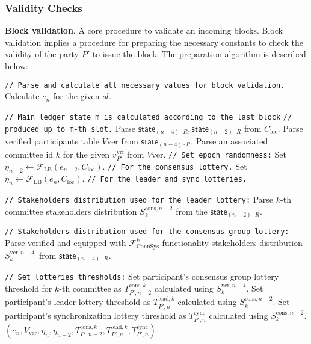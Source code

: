 \subsubsection{Validity Checks}
\textbf{Block validation}.
A core procedure to validate an incoming blocks.
Block validation implies a procedure for preparing the necessary constants to check the validity of the party $P'$ to issue the block.
The preparation algorithm is described below:
\begin{algo}
    \caption{$\textsf{PrepareForBlockValidation}(sl, R, v_{P'}^{\text{vrf}}, C_{\text{loc}})$}
    \begin{algorithmic}[1]
        \noindent
        \lstinline|// Parse and calculate all necessary values for block validation.|
        \State Calculate $e_n$ for the given $sl$.

        \noindent
        \lstinline|// Main ledger state_m is calculated according to the last block|
        \noindent
        \lstinline|// produced up to m-th slot.|
        \State Parse $\textsf{state}_{(n - 4)\cdot R},
        \textsf{state}_{(n - 2)\cdot R}$ from $C_{\text{loc}}$.
        \State Parse verified participants table $V{\text{ver}}$ from $\textsf{state}_{(n - 4)\cdot R}$.
        \State Parse an associated committee id $k$ for the given $v_{P'}^{\text{vrf}}$ from $V{\text{ver}}$.
        \noindent
        \lstinline|// Set epoch randomness:|
        \State Set ${\eta_{n-2} \leftarrow \mathcal{F}_{\text{LB}}(e_{n-2}, C_{\text{loc}})}$. \lstinline|// For the consensus lottery.|
        \State Set ${\eta_{n} \leftarrow \mathcal{F}_{\text{LB}}(e_{n}, C_{\text{loc}})}$. \lstinline|// For the leader and sync lotteries.|

        \noindent
        \lstinline|// Stakeholders distribution used for the leader lottery:|
        \State Parse $k$-th committee stakeholders distribution $S_k^{\text{cons}, n - 2}$ from the $\textsf{state}_{(n - 2)\cdot R}$.

        \noindent
        \lstinline|// Stakeholders distribution used for the consensus group lottery:|
        \State Parse verified and equipped with $\mathcal{F}^k_{\text{ConnSys}}$ functionality stakeholders distribution $S_k^{\text{ver}, {n - 4}}$\
        from $\textsf{state}_{(n - 4)\cdot R}$.

        \noindent
        \lstinline|// Set lotteries thresholds:|
        \State Set participant's consensus group lottery threshold for $k$-th committee as $T_{P', n-2}^{\text{cons}, k}$ calculated using $S_k^{\text{ver}, {n - 4}}$.
        \State Set participant's leader lottery threshold as $T_{P', n}^{\text{lead}, k}$ calculated using $S_k^{\text{cons}, {n - 2}}$.
        \State Set participant's synchronization lottery threshold as $T_{P', n}^{\text{sync}}$ calculated using $S_k^{\text{cons}, {n - 2}}$.
        \State \Return ${(e_n, V_{\text{ver}}, \eta_{n}, \eta_{n - 2}, T_{P', n-2}^{\text{cons}, k}, T_{P', n}^{\text{lead}, k}, T_{P', n}^{\text{sync}})}$
    \end{algorithmic}\label{alg:algorithm-2.0}
\end{algo}

